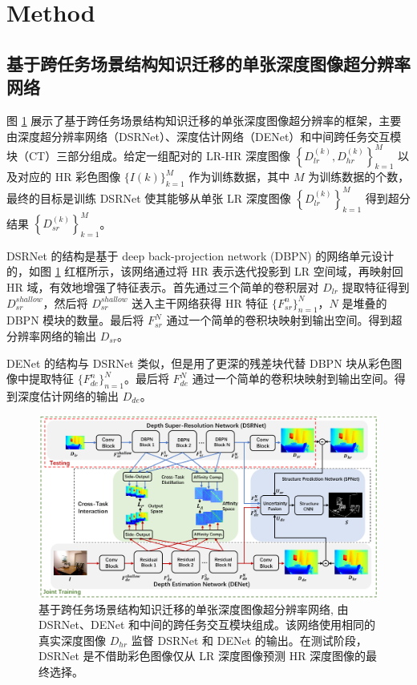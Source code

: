 \documentclass{vip-theme}
\begin{document}
\begin{sloppypar}
\begin{itemize}
\end{itemize}

\section{Method}
\label{method}
\subsection{基于跨任务场景结构知识迁移的单张深度图像超分辨率网络}

图 \ref{fig:mainnet} 展示了基于跨任务场景结构知识迁移的单张深度图像超分辨率的框架，主要由深度超分辨率网络（DSRNet）、深度估计网络（DENet）和中间跨任务交互模块（CT）三部分组成。给定一组配对的 LR-HR 深度图像 $\left\{D_{l r}^{(k)}, D_{h r}^{(k)}\right\}_{k=1}^{M}$ 以及对应的 HR 彩色图像 $\{I(k)\}_{k=1}^{M}$ 作为训练数据，其中 $M$ 为训练数据的个数，最终的目标是训练 DSRNet 使其能够从单张 LR 深度图像 $\left\{D_{l r}^{(k)}\right\}_{k=1}^{M}$ 得到超分结果 $\left\{D_{s r}^{(k)}\right\}_{k=1}^{M}$。

DSRNet 的结构是基于 deep back-projection network (DBPN) 的网络单元设计的，如图 \ref{fig:mainnet} 红框所示，该网络通过将 HR 表示迭代投影到 LR 空间域，再映射回 HR 域，有效地增强了特征表示。首先通过三个简单的卷积层对 $D_{lr}$ 提取特征得到 $D_{sr}^{shallow}$，然后将 $D_{sr}^{shallow}$ 送入主干网络获得 HR 特征 $\{F_{sr}^n\}_{n=1}^N$，$N$ 是堆叠的 DBPN 模块的数量。最后将 $F_{sr}^N$ 通过一个简单的卷积块映射到输出空间。得到超分辨率网络的输出 $D_{sr}$。

DENet 的结构与 DSRNet 类似，但是用了更深的残差块代替 DBPN 块从彩色图像中提取特征 $\{F_{de}^n\}_{n=1}^N$。最后将 $F_{de}^N$ 通过一个简单的卷积块映射到输出空间。得到深度估计网络的输出 $D_{de}$。

\begin{figure}[!htbp]
	\centering
	\centerline{\includegraphics[width=1\linewidth]{figure/mainnet8.png}}
	\caption{基于跨任务场景结构知识迁移的单张深度图像超分辨率网络, 由 DSRNet、DENet 和中间的跨任务交互模块组成。该网络使用相同的真实深度图像 $D_{hr}$ 监督 DSRNet 和 DENet 的输出。在测试阶段，DSRNet 是不借助彩色图像仅从 LR 深度图像预测 HR 深度图像的最终选择。}
	\label{fig:mainnet}
\vspace{-4mm}
\end{figure}


\end{sloppypar}
\end{document}
